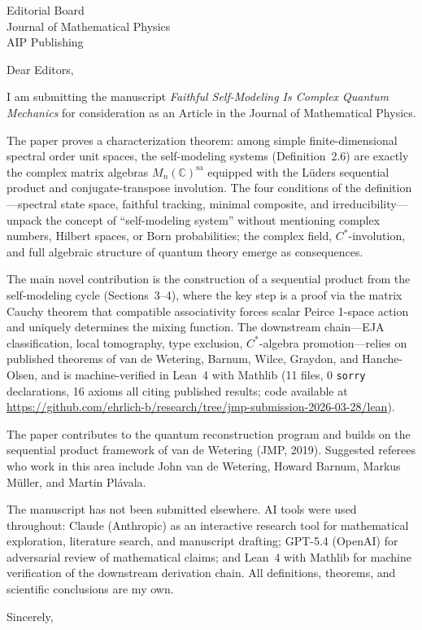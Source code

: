 \documentclass[11pt]{letter}
\begin{document}
\begin{letter}{Editorial Board\\Journal of Mathematical Physics\\AIP Publishing}

\opening{Dear Editors,}

I am submitting the manuscript \emph{Faithful Self-Modeling Is Complex
Quantum Mechanics} for consideration as an Article in the Journal of
Mathematical Physics.

The paper proves a characterization theorem: among simple
finite-dimensional spectral order unit spaces, the self-modeling
systems (Definition~2.6) are exactly the complex matrix algebras
$M_n(\mathbb{C})^{\mathrm{sa}}$ equipped with the L\"uders sequential
product and conjugate-transpose involution.  The four conditions of
the definition---spectral state space, faithful tracking, minimal
composite, and irreducibility---unpack the concept of ``self-modeling
system'' without mentioning complex numbers, Hilbert spaces, or Born
probabilities; the complex field, $C^*$-involution, and full algebraic
structure of quantum theory emerge as consequences.

The main novel contribution is the construction of a sequential
product from the self-modeling cycle (Sections~3--4), where the key
step is a proof via the matrix Cauchy theorem that compatible
associativity forces scalar Peirce 1-space action and uniquely
determines the mixing function.  The downstream chain---EJA
classification, local tomography, type exclusion, $C^*$-algebra
promotion---relies on published theorems of van de Wetering, Barnum,
Wilce, Graydon, and Hanche-Olsen, and is machine-verified in Lean~4
with Mathlib (11 files, 0 \texttt{sorry} declarations, 16 axioms all
citing published results; code available at
\url{https://github.com/ehrlich-b/research/tree/jmp-submission-2026-03-28/lean}).

The paper contributes to the quantum reconstruction program and builds
on the sequential product framework of van de Wetering (JMP, 2019).
Suggested referees who work in this area include John van de Wetering,
Howard Barnum, Markus M\"uller, and Martin Pl\'avala.

The manuscript has not been submitted elsewhere.  AI tools were used
throughout: Claude (Anthropic) as an interactive research tool for
mathematical exploration, literature search, and manuscript drafting;
GPT-5.4 (OpenAI) for adversarial review of mathematical claims; and Lean~4 with Mathlib for machine verification of the
downstream derivation chain.  All definitions, theorems, and
scientific conclusions are my own.

\closing{Sincerely,}

\end{letter}
\end{document}
